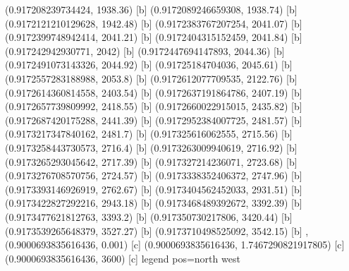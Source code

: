 {{{(0.917208239734424, 1938.36) [b] 
(0.9172089246659308, 1938.74) [b] 
(0.9172121210129628, 1942.48) [b] 
(0.9172383767207254, 2041.07) [b] 
(0.9172399748942414, 2041.21) [b] 
(0.9172404315152459, 2041.84) [b] 
(0.917242942930771, 2042) [b] 
(0.9172447694147893, 2044.36) [b] 
(0.9172491073143326, 2044.92) [b] 
(0.91725184704036, 2045.61) [b] 
(0.9172557283188988, 2053.8) [b] 
(0.9172612077709535, 2122.76) [b] 
(0.9172614360814558, 2403.54) [b] 
(0.9172637191864786, 2407.19) [b] 
(0.9172657739809992, 2418.55) [b] 
(0.9172660022915015, 2435.82) [b] 
(0.9172687420175288, 2441.39) [b] 
(0.9172952384007725, 2481.57) [b] 
(0.9173217347840162, 2481.7) [b] 
(0.917325616062555, 2715.56) [b] 
(0.9173258443730573, 2716.4) [b] 
(0.9173263009940619, 2716.92) [b] 
(0.9173265293045642, 2717.39) [b] 
(0.917327214236071, 2723.68) [b] 
(0.9173276708570756, 2724.57) [b] 
(0.9173338352406372, 2747.96) [b] 
(0.9173393146926919, 2762.67) [b] 
(0.9173404562452033, 2931.51) [b] 
(0.9173422827292216, 2943.18) [b] 
(0.9173468489392672, 3392.39) [b] 
(0.9173477621812763, 3393.2) [b] 
(0.917350730217806, 3420.44) [b] 
(0.9173539265648379, 3527.27) [b] 
(0.9173710498525092, 3542.15) [b] 
},{(0.9000693835616436, 0.001) [c] 
(0.9000693835616436, 1.7467290821917805) [c] 
(0.9000693835616436, 3600) [c] 
}}}{legend pos=north west}